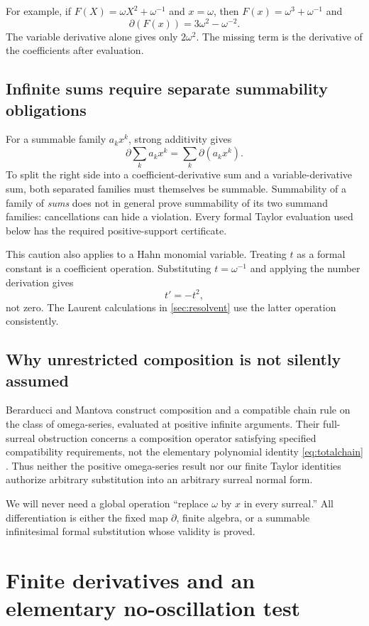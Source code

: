\documentclass[11pt,letterpaper]{article}
\numberwithin{equation}{section}
\theoremstyle{definition}
\theoremstyle{remark}
\newcommand{\der}{\partial}
\begin{document}
For example, if $F(X)=\omega X^2+\omega^{-1}$ and $x=\omega$, then $F(x)=\omega^3+\omega^{-1}$ and
\[
 \der(F(x))=3\omega^2-\omega^{-2}.
\]
The variable derivative alone gives only $2\omega^2$. The missing term is the derivative of the coefficients after evaluation.

\subsection{Infinite sums require separate summability obligations}
For a summable family $a_kx^k$, strong additivity gives
\[
 \der\sum_k a_kx^k=\sum_k\der(a_kx^k).
\]
To split the right side into a coefficient-derivative sum and a variable-derivative sum, both separated families must themselves be summable. Summability of a family of \emph{sums} does not in general prove summability of its two summand families: cancellations can hide a violation. Every formal Taylor evaluation used below has the required positive-support certificate.

This caution also applies to a Hahn monomial variable. Treating $t$ as a formal constant is a coefficient operation. Substituting $t=\omega^{-1}$ and applying the number derivation gives
\[
 t'=-t^2,
\]
not zero. The Laurent calculations in \cref{sec:resolvent} use the latter operation consistently.

\subsection{Why unrestricted composition is not silently assumed}
Berarducci and Mantova construct composition and a compatible chain rule on the class of omega-series, evaluated at positive infinite arguments. Their full-surreal obstruction concerns a composition operator satisfying specified compatibility requirements, not the elementary polynomial identity \eqref{eq:totalchain} \cite[Theorem 6.3, Corollary 7.7, and Theorem 8.4]{BMGerms}. Thus neither the positive omega-series result nor our finite Taylor identities authorize arbitrary substitution into an arbitrary surreal normal form.

We will never need a global operation ``replace $\omega$ by $x$ in every surreal.'' All differentiation is either the fixed map $\der$, finite algebra, or a summable infinitesimal formal substitution whose validity is proved.

\section{Finite derivatives and an elementary no-oscillation test}\label{sec:finite}
\end{document}
